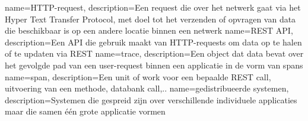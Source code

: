 	{
		name={HTTP-request},
		description={Een request die over het netwerk gaat via het Hyper Text Transfer Protocol, met doel tot het verzenden of opvragen van data die beschikbaar is op een andere locatie binnen een netwerk}
	}
	{
		name={REST API},
		description={Een \gls{API} die gebruik maakt van \gls{HTTP-request}s om data op te halen of te updaten via \gls{REST}}
	}
	{
		name={trace},
		description={Een object dat data bevat over het gevolgde pad van een user-request binnen een applicatie in de vorm van \gls{span}s}
	}
	{
		name={span},
		description={Een unit of work voor een bepaalde \gls{REST} call, uitvoering van een methode, databank call,..}
	}
	{
		name={gedistribueerde systemen},
		description={Systemen die gespreid zijn over verschillende individuele applicaties maar die samen één grote applicatie vormen}
	}

